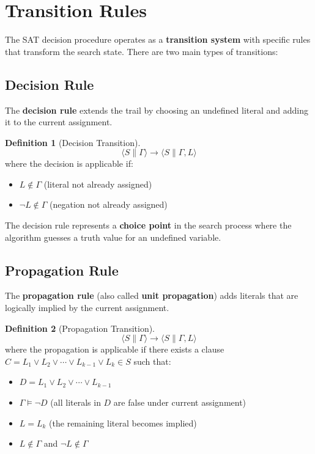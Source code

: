 \documentclass[11pt,a4paper]{article}
\theoremstyle{definition}
\newtheorem{definition}{Definition}[section]
\theoremstyle{plain}
\theoremstyle{remark}
\begin{document}
\section{Transition Rules}

The SAT decision procedure operates as a \textbf{transition system} with specific rules that transform the search state. There are two main types of transitions:

\subsection{Decision Rule}

The \textbf{decision rule} extends the trail by choosing an undefined literal and adding it to the current assignment.

\begin{tcolorbox}[colback=purple!5!white,colframe=purple!75!black,title=\textbf{Decision Rule}]
\begin{definition}[Decision Transition]
\[
\langle S \parallel \varGamma \rangle \rightarrow \langle S \parallel \varGamma, L \rangle
\]
where the decision is applicable if:
\begin{itemize}
    \item $L \notin \varGamma$ (literal not already assigned)
    \item $\neg L \notin \varGamma$ (negation not already assigned)
\end{itemize}
\end{definition}
\end{tcolorbox}

The decision rule represents a \textbf{choice point} in the search process where the algorithm guesses a truth value for an undefined variable.

\subsection{Propagation Rule}

The \textbf{propagation rule} (also called \textbf{unit propagation}) adds literals that are logically implied by the current assignment.

\begin{tcolorbox}[colback=orange!10!white,colframe=orange!75!black,title=\textbf{Propagation Rule}]
\begin{definition}[Propagation Transition]
\[
\langle S \parallel \varGamma \rangle \rightarrow \langle S \parallel \varGamma, L \rangle
\]
where the propagation is applicable if there exists a clause $C = L_1 \lor L_2 \lor \cdots \lor L_{k-1} \lor L_k \in S$ such that:
\begin{itemize}
    \item $D = L_1 \lor L_2 \lor \cdots \lor L_{k-1}$
    \item $\varGamma \models \neg D$ (all literals in $D$ are false under current assignment)
    \item $L = L_k$ (the remaining literal becomes implied)
    \item $L \notin \varGamma$ and $\neg L \notin \varGamma$
\end{itemize}
\end{definition}
\end{tcolorbox}
\end{document}
